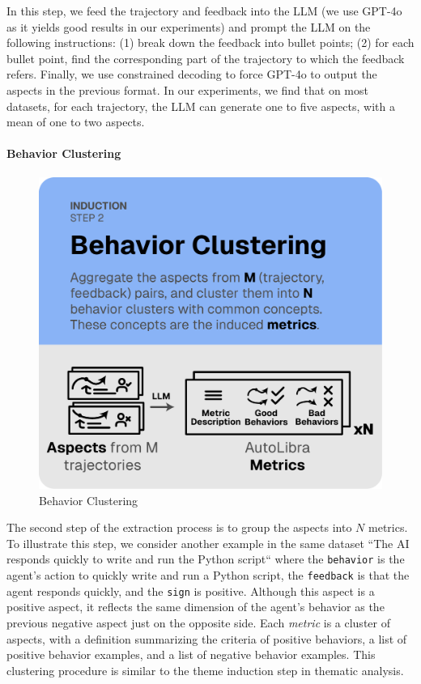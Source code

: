 In this step, we feed the trajectory and feedback into the LLM (we use GPT-4o \citep{openai2024gpt4ocard} 
as it yields good results in our experiments) and prompt the LLM on the following instructions:
(1) break down the feedback into bullet points; (2) for each bullet point, find the corresponding
part of the trajectory to which the feedback refers. Finally, we use constrained decoding to force GPT-4o
to output the aspects in the previous format. In our experiments, we find that on most datasets, for each
trajectory, the LLM can generate one to five aspects, with a mean of one to two aspects.


\paragraph{Behavior Clustering}
\begin{figure}
  \vspace{-15pt}
  \includegraphics[width=\linewidth]{figs/autolibra_step_2.pdf}
  \vspace{-10pt}
  \caption{Behavior Clustering}
  \label{fig:behavior_clustering}
\end{figure}
The second step of the extraction process is to group the aspects into $N$ metrics.
To illustrate this step, we consider another example in the same dataset
\textsf{``The AI responds quickly to write and run the Python script``} where
the \texttt{behavior} is the agent's action to quickly write and run a Python script, the \texttt{feedback}
is that the agent responds quickly, and the \texttt{sign} is positive. Although this aspect is a positive aspect,
it reflects the same dimension of the agent's behavior as the previous negative aspect just on the opposite side.
Each \emph{metric} is a cluster of aspects, with a definition summarizing the criteria of positive behaviors, a list of positive behavior examples, and a list of negative behavior examples. This clustering procedure
is similar to the theme induction step in thematic analysis.


